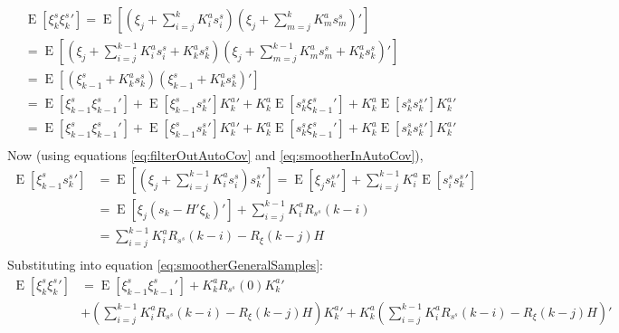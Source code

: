 \documentclass[oneside,12pt]{article}
\begin{document}
\begin{equation}\label{eq:smootherGeneralSamples}
    \begin{split}
        &\operatorname{E}[\xi^s_{k}\xi^s_{k}'] = \operatorname{E}[(\xi_j + \sum_{i=j}^{k} K^a_{i} s^s_{i})(\xi_j + \sum_{m=j}^{k} K^a_{m} s^s_{m})']\\
        &= \operatorname{E}[(\xi_j + \sum_{i=j}^{k-1} K^a_{i} s^s_{i} + K^a_{k} s^s_{k}) (\xi_j + \sum_{m=j}^{k-1} K^a_{m} s^s_{m} + K^a_{k} s^s_{k})']\\
        &= \operatorname{E}[(\xi^s_{k-1} + K^a_{k} s^s_{k}) (\xi_{k-1}^s + K^a_{k} s^s_{k})']\\
        &= \operatorname{E}[\xi^s_{k-1} \xi^s_{k-1}'] 
        + \operatorname{E}[\xi^s_{k-1} s^s_{k}' ] K^a_{k}' 
        + K^a_{k} \operatorname{E}[ s^s_{k} \xi^s_{k-1}']
        + K^a_{k} \operatorname{E}[ s^s_{k} s^s_{k}' ] K^a_{k}'\\
        &= \operatorname{E}[\xi^s_{k-1} \xi^s_{k-1}'] 
        + \operatorname{E}[\xi^s_{k-1} s^s_{k}' ] K^a_{k}' 
        + K^a_{k} \operatorname{E}[ s^s_{k} \xi^s_{k-1}']
        + K^a_{k} \operatorname{E}[ s^s_{k} s^s_{k}' ] K^a_{k}'\\
    \end{split}
\end{equation}
%
Now (using equations \ref{eq:filterOutAutoCov} and \ref{eq:smootherInAutoCov}),
%
\begin{equation}
    \begin{split}
        \operatorname{E}[\xi^s_{k-1} s^s_{k}' ] &= \operatorname{E}[(\xi_j + \sum_{i=j}^{k-1} K^a_{i} s^s_{i}) s^s_{k}' ] = \operatorname{E}[\xi_j s^s_{k}'] + \sum_{i=j}^{k-1} K^a_{i} \operatorname{E}[ s^s_{i} s^s_{k}']\\
        &= \operatorname{E}[\xi_j (s_{k} - H' \xi_k)'] + \sum_{i=j}^{k-1} K^a_{i} R_{s^s}(k-i)\\
        &= \sum_{i=j}^{k-1} K^a_{i} R_{s^s}(k-i) - R_{\xi}(k-j) H\\
    \end{split}
\end{equation}
%
Substituting into equation \ref{eq:smootherGeneralSamples}:
%
\begin{equation}\label{eq:smoothingUnmodeledErrRecursive}
    \begin{split}
        \operatorname{E}[\xi^s_{k}\xi^s_{k}'] &= \operatorname{E}[\xi^s_{k-1} \xi^s_{k-1}'] + K^a_{k} R_{s^s}(0) K^a_{k}'\\ 
        &+ (\sum_{i=j}^{k-1} K^a_{i} R_{s^s}(k-i) - R_{\xi}(k-j) H) K^a_{k}' 
        + K^a_{k} (\sum_{i=j}^{k-1} K^a_{i} R_{s^s}(k-i) - R_{\xi}(k-j) H)'
    \end{split}
\end{equation}
\end{document}
